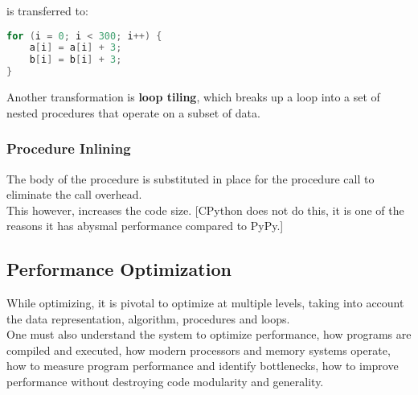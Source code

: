 \documentclass[11pt,a4paper,twocolumn]{book}
\begin{document}
is transferred to:
\begin{lstlisting}[language=C]
for (i = 0; i < 300; i++) {
	a[i] = a[i] + 3;
	b[i] = b[i] + 3;
}
\end{lstlisting}

Another transformation is \textbf{loop tiling}, which breaks up a loop into a set of nested procedures that operate on a subset of data.

\subsubsection{Procedure Inlining}

The body of the procedure is substituted in place for the procedure call to eliminate the call overhead.\\

This however, increases the code size. [CPython does not do this, it is one of the reasons it has abysmal performance compared to PyPy.]

\subsection{Performance Optimization}
While optimizing, it is pivotal to optimize at multiple levels, taking into account the data representation, algorithm, procedures and loops.\\

One must also understand the system to optimize performance, how programs are compiled and executed, how modern processors and memory systems operate, how to measure program performance and identify bottlenecks, how to improve performance without destroying code modularity and generality.
\end{document}
